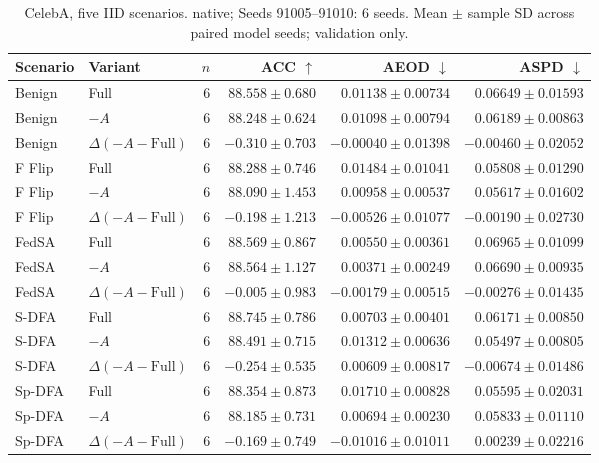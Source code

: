 \begin{table}[t]
\centering
\small
\caption{CelebA, five IID scenarios. native; Seeds 91005–91010: 6 seeds. Mean $\pm$ sample SD across paired model seeds; validation only.}
\begin{tabular}{llrrrr}
\toprule
Scenario & Variant & $n$ & ACC $\uparrow$ & AEOD $\downarrow$ & ASPD $\downarrow$ \\
\midrule
Benign & Full & 6 & $88.558 \pm 0.680$ & $0.01138 \pm 0.00734$ & $0.06649 \pm 0.01593$ \\
Benign & $-A$ & 6 & $88.248 \pm 0.624$ & $0.01098 \pm 0.00794$ & $0.06189 \pm 0.00863$ \\
Benign & $\Delta(-A-\mathrm{Full})$ & 6 & $-0.310 \pm 0.703$ & $-0.00040 \pm 0.01398$ & $-0.00460 \pm 0.02052$ \\
F Flip & Full & 6 & $88.288 \pm 0.746$ & $0.01484 \pm 0.01041$ & $0.05808 \pm 0.01290$ \\
F Flip & $-A$ & 6 & $88.090 \pm 1.453$ & $0.00958 \pm 0.00537$ & $0.05617 \pm 0.01602$ \\
F Flip & $\Delta(-A-\mathrm{Full})$ & 6 & $-0.198 \pm 1.213$ & $-0.00526 \pm 0.01077$ & $-0.00190 \pm 0.02730$ \\
FedSA & Full & 6 & $88.569 \pm 0.867$ & $0.00550 \pm 0.00361$ & $0.06965 \pm 0.01099$ \\
FedSA & $-A$ & 6 & $88.564 \pm 1.127$ & $0.00371 \pm 0.00249$ & $0.06690 \pm 0.00935$ \\
FedSA & $\Delta(-A-\mathrm{Full})$ & 6 & $-0.005 \pm 0.983$ & $-0.00179 \pm 0.00515$ & $-0.00276 \pm 0.01435$ \\
S-DFA & Full & 6 & $88.745 \pm 0.786$ & $0.00703 \pm 0.00401$ & $0.06171 \pm 0.00850$ \\
S-DFA & $-A$ & 6 & $88.491 \pm 0.715$ & $0.01312 \pm 0.00636$ & $0.05497 \pm 0.00805$ \\
S-DFA & $\Delta(-A-\mathrm{Full})$ & 6 & $-0.254 \pm 0.535$ & $0.00609 \pm 0.00817$ & $-0.00674 \pm 0.01486$ \\
Sp-DFA & Full & 6 & $88.354 \pm 0.873$ & $0.01710 \pm 0.00828$ & $0.05595 \pm 0.02031$ \\
Sp-DFA & $-A$ & 6 & $88.185 \pm 0.731$ & $0.00694 \pm 0.00230$ & $0.05833 \pm 0.01110$ \\
Sp-DFA & $\Delta(-A-\mathrm{Full})$ & 6 & $-0.169 \pm 0.749$ & $-0.01016 \pm 0.01011$ & $0.00239 \pm 0.02216$ \\
\bottomrule
\end{tabular}
\end{table}

